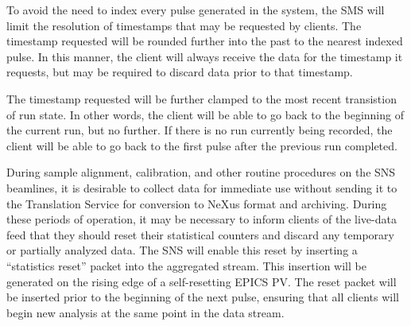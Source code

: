 To avoid the need to index every pulse generated in the system, the SMS will
limit the resolution of timestamps that may be requested by clients. The
timestamp requested will be rounded further into the past to the nearest
indexed pulse. In this manner, the client will always receive the data
for the timestamp it requests, but may be required to discard data prior
to that timestamp.

The timestamp requested will be further clamped to the most recent transistion
of run state. In other words, the client will be able to go back to the
beginning of the current run, but no further. If there is no run currently
being recorded, the client will be able to go back to the first pulse after
the previous run completed.

During sample alignment, calibration, and other routine procedures on
the SNS beamlines, it is desirable to collect data for immediate use
without sending it to the Translation Service for conversion to NeXus
format and archiving. During these periods of operation, it may be
necessary to inform clients of the live-data feed that they should reset
their statistical counters and discard any temporary or partially
analyzed data. The SNS will enable this reset by inserting a ``statistics
reset'' packet into the aggregated stream. This insertion will be
generated on the rising edge of a self-resetting EPICS PV. The reset packet
will be inserted prior to the beginning of the next pulse, ensuring that
all clients will begin new analysis at the same point in the data stream.



